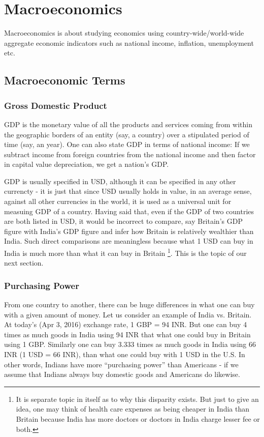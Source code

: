 \chapter{Macroeconomics}
Macroeconomics is about studying economics using country-wide/world-wide aggregate economic indicators such as national income, inflation, unemployment etc. 

\section{Macroeconomic Terms}
\subsection{Gross Domestic Product}
GDP is the monetary value of all the products and services coming from within the geographic borders of an entity (say, a country) over a stipulated period of time (say, an year). One can also state GDP in terms of national income: If we subtract income from foreign countries from the national income and then factor in capital value depreciation, we get a nation's GDP. 

GDP is usually specified in USD, although it can be specified in any other currencty - it is just that since USD usually holds in value, in an average sense, against all other currencies in the world, it is used as a universal unit for measuing GDP of a country. Having said that, even if the GDP of two countries are both listed in USD, it would be incorrect to compare, say Britain's GDP figure with India's GDP figure and infer how Britain is relatively wealthier than India. Such direct comparisons are meaningless because what 1 USD can buy in India is much more than what it can buy in Britain \footnote{It is separate topic in itself as to why this disparity exists. But just to give an idea, one may think of health care expenses as being cheaper in India than Britain because India has more doctors or doctors in India charge lesser fee or both.}. This is the topic of our next section.

\subsection{Purchasing Power}
From one country to another, there can be huge differences in what one can buy with a given amount of money. Let us consider an example of India vs. Britain. At today's (Apr 3, 2016) exchange rate, 1 GBP = 94 INR. But one can buy 4 times as much goods in India using 94 INR that what one could buy in Britain using 1 GBP. Similarly one can buy 3.333 times as much goods in India using 66 INR (1 USD = 66 INR), than what one could buy with 1 USD in the U.S. In other words, Indians have more ``purchasing power'' than Americans - if we assume that Indians always buy domestic goods and Americans do likewise.

